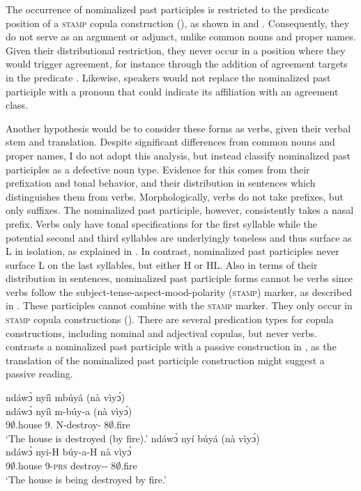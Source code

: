 The occurrence of nominalized past participles is restricted to the predicate position of a \textsc{stamp} copula construction (), as shown in  and . Consequently, they do not serve as an argument or adjunct, unlike common nouns and proper names. Given their distributional restriction, they never occur in a position where they would trigger agreement, for instance through the addition of agreement targets in the predicate {\NP}. Likewise, speakers would not replace the nominalized past participle with a pronoun that could indicate its affiliation with an agreement class.

Another hypothesis would be to consider these forms as verbs, given their verbal stem and translation. Despite significant differences from common nouns and proper names,  I do not adopt this analysis, but instead classify nominalized past participles as a defective noun type. Evidence for this comes from their prefixation and tonal behavior, and their distribution in sentences which distinguishes them from verbs.   Morphologically, verbs do not take prefixes, but only suffixes. The nominalized past participle, however, consistently takes a nasal prefix. Verbs only have tonal specifications for the first syllable while the potential second and third syllables are underlyingly toneless and thus surface as L in isolation, as explained in . In contrast, nominalized past participles never surface L on the last syllables, but either H or HL.  Also in terms of their distribution in sentences, nominalized past participle forms cannot be verbs since verbs follow the subject-tense-aspect-mood-polarity (\textsc{stamp}) marker, as described in . These participles cannot combine with the \textsc{stamp} marker. They only occur in \textsc{stamp} copula constructions (). There are several predication types for copula constructions, including nominal and adjectival copulas, but never verbs.  contrasts a nominalized past participle with a passive construction in , as the translation of the nominalized past participle construction might suggest a passive reading.

\ea \label{COPNom}
  \ea \label{COPNoma}
\glll ndáwɔ̀ nyíì mbúyâ (nà vìyɔ́) \\
	ndáwɔ̀ nyíì m-búy-a (nà vìyɔ́) \\
	9$\emptyset$.house 9.{\COP} N-destroy-{\NOM} {\COM} 8$\emptyset$.fire \\
 \trans `The house is destroyed (by fire).'
\ex\label{COPNomb}
\glll ndáwɔ̀ nyí búyá (nà vìyɔ́)\\
	ndáwɔ̀ nyi-H búy-a-H nà vìyɔ́\\
	9$\emptyset$.house 9-\textsc{prs} destroy-{\PASS}-{\R} {\COM} 8$\emptyset$.fire \\
 \trans `The house is being destroyed by fire.'
\z
\z

